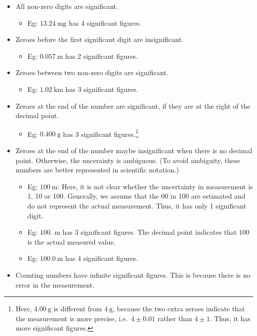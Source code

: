 \documentclass[
  14pt,
]{extarticle}
\providecommand{\tightlist}{%
  \setlength{\itemsep}{0pt}\setlength{\parskip}{0pt}}
\begin{document}
\begin{itemize}
\tightlist
\item
  All non-zero digits are significant.

  \begin{itemize}
  \tightlist
  \item
    Eg: \({13.24~\mathrm{mg}}\) has 4 significant figures.
  \end{itemize}
\item
  Zeroes before the first significant digit are insignificant.

  \begin{itemize}
  \tightlist
  \item
    Eg: \({0.057~\mathrm{m}}\) has 2 significant figures.
  \end{itemize}
\item
  Zeroes between two non-zero digits are significant.

  \begin{itemize}
  \tightlist
  \item
    Eg: \({1.02~\mathrm{km}}\) has 3 significant figures.
  \end{itemize}
\item
  Zeroes at the end of the number are significant, if they are at the
  right of the decimal point.

  \begin{itemize}
  \tightlist
  \item
    Eg: \({0.400~\mathrm{g}}\) has 3 significant figures.\footnote{Here,
      \({4.00~\mathrm{g}}\) is different from \({4~\mathrm{g}}\),
      because the two extra zeroes indicate that the measurement is more
      precise, i.e.~\(4\pm 0.01\) rather than \(4\pm 1\). Thus, it has
      more significant figures.}
  \end{itemize}
\item
  Zeroes at the end of the number maybe insignificant when there is no
  decimal point. Otherwise, the uncerainty is ambiguous. (To avoid
  ambiguity, these numbers are better represented in scientific
  notation.)

  \begin{itemize}
  \tightlist
  \item
    Eg: \({100~\mathrm{m}}\): Here, it is not clear whether the
    uncertainty in measurement is 1, 10 or 100. Generally, we assume
    that the 00 in 100 are estimated and do not represent the actual
    measurement. Thus, it has only 1 significant digit.
  \item
    Eg: \(100.\text{ m}\) has 3 significant figures. The decimal point
    indicates that \(100\) is the actual measured value.
  \item
    Eg: \({100.0~\mathrm{m}}\) has 4 significant figures.
  \end{itemize}
\item
  Counting numbers have infinite significant figures. This is because
  there is no error in the measurement.


\end{itemize}
\end{document}

